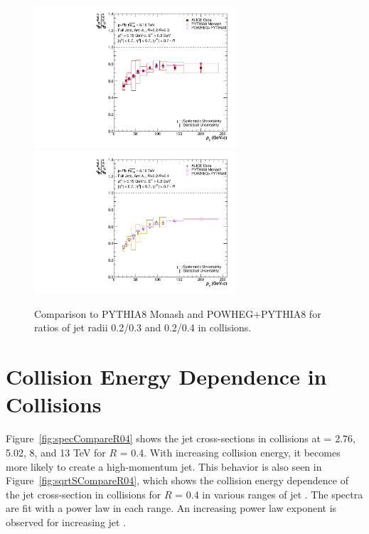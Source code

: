 \begin{figure}
    \centering
    \begin{multicols}{2}
            \includegraphics[width=7.5cm]{figures/pPbFigures/MCGen/MCComp_Ratio_R0302_nooutlier.pdf}
        \vfill\null
        \columnbreak
            \includegraphics[width=7.5cm]{figures/pPbFigures/MCGen/MCComp_Ratio_R0402_nooutlier.pdf}
        \vfill\null
    \end{multicols}
    \caption{Comparison to PYTHIA8 Monash and POWHEG+PYTHIA8 for ratios of jet radii 0.2/0.3 and 0.2/0.4 in \pPb collisions.}
    \label{fig:MCGen_Ratio_pPb}
\end{figure}

\section{Collision Energy Dependence in \pp Collisions}
\label{sec:CollEnergyDep}

Figure~\ref{fig:specCompareR04} shows the jet cross-sections in \pp collisions at \s = 2.76, 5.02, 8, and 13 TeV for $R$ = 0.4. With increasing collision energy, it becomes more likely to create a high-momentum jet. This behavior is also seen in Figure~\ref{fig:sqrtSCompareR04}, which shows the collision energy dependence of the jet cross-section in \pp collisions for $R$ = 0.4 in various ranges of jet \pT. The spectra are fit with a power law in each \pT range. An increasing power law exponent is observed for increasing jet \pT.

